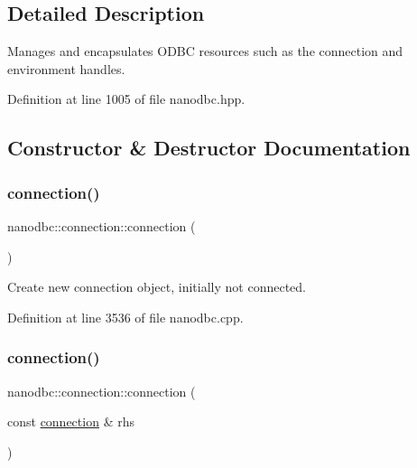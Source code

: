 \subsection{Detailed Description}
Manages and encapsulates O\+D\+BC resources such as the connection and environment handles. 

Definition at line 1005 of file nanodbc.\+hpp.



\subsection{Constructor \& Destructor Documentation}
\mbox{\label{classnanodbc_1_1connection_aab3f1b405cc87c780b3ec5e95665284d}} 
\subsubsection{\texorpdfstring{connection()}{connection()}\hspace{0.1cm}{\footnotesize\ttfamily [1/5]}}
{\footnotesize\ttfamily nanodbc\+::connection\+::connection (\begin{DoxyParamCaption}{ }\end{DoxyParamCaption})}



Create new connection object, initially not connected. 



Definition at line 3536 of file nanodbc.\+cpp.

\mbox{\label{classnanodbc_1_1connection_aaea353f8c2f0b4576bc4c95bed330b46}} 
\subsubsection{\texorpdfstring{connection()}{connection()}\hspace{0.1cm}{\footnotesize\ttfamily [2/5]}}
{\footnotesize\ttfamily nanodbc\+::connection\+::connection (\begin{DoxyParamCaption}\item[{const \mbox{\hyperlink{classnanodbc_1_1connection}{connection}} \&}]{rhs }\end{DoxyParamCaption})}



